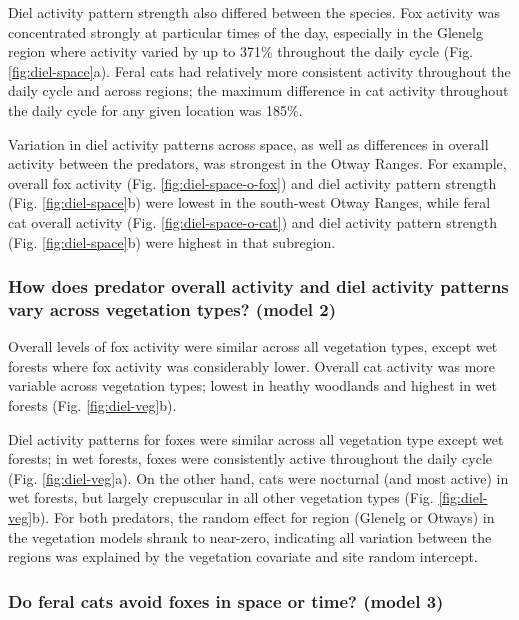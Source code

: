\documentclass[]{elsarticle} %
\begin{document}
Diel activity pattern strength also differed between the species. Fox activity was concentrated strongly at particular times of the day, especially in the Glenelg region where activity varied by up to 371\% throughout the daily cycle (Fig. \ref{fig:diel-space}a). Feral cats had relatively more consistent activity throughout the daily cycle and across regions; the maximum difference in cat activity throughout the daily cycle for any given location was 185\%.

Variation in diel activity patterns across space, as well as differences in overall activity between the predators, was strongest in the Otway Ranges. For example, overall fox activity (Fig. \ref{fig:diel-space-o-fox}) and diel activity pattern strength (Fig. \ref{fig:diel-space}b) were lowest in the south-west Otway Ranges, while feral cat overall activity (Fig. \ref{fig:diel-space-o-cat}) and diel activity pattern strength (Fig. \ref{fig:diel-space}b) were highest in that subregion.

\hypertarget{how-does-predator-overall-activity-and-diel-activity-patterns-vary-across-vegetation-types-model-2-1}{%
\subsubsection{How does predator overall activity and diel activity patterns vary across vegetation types? (model 2)}\label{how-does-predator-overall-activity-and-diel-activity-patterns-vary-across-vegetation-types-model-2-1}}

Overall levels of fox activity were similar across all vegetation types, except wet forests where fox activity was considerably lower. Overall cat activity was more variable across vegetation types; lowest in heathy woodlands and highest in wet forests (Fig. \ref{fig:diel-veg}b).

Diel activity patterns for foxes were similar across all vegetation type except wet forests; in wet forests, foxes were consistently active throughout the daily cycle (Fig. \ref{fig:diel-veg}a). On the other hand, cats were nocturnal (and most active) in wet forests, but largely crepuscular in all other vegetation types (Fig. \ref{fig:diel-veg}b). For both predators, the random effect for region (Glenelg or Otways) in the vegetation models shrank to near-zero, indicating all variation between the regions was explained by the vegetation covariate and site random intercept.

\hypertarget{do-feral-cats-avoid-foxes-in-space-or-time-model-3-1}{%
\subsubsection{Do feral cats avoid foxes in space or time? (model 3)}\label{do-feral-cats-avoid-foxes-in-space-or-time-model-3-1}}
\end{document}
